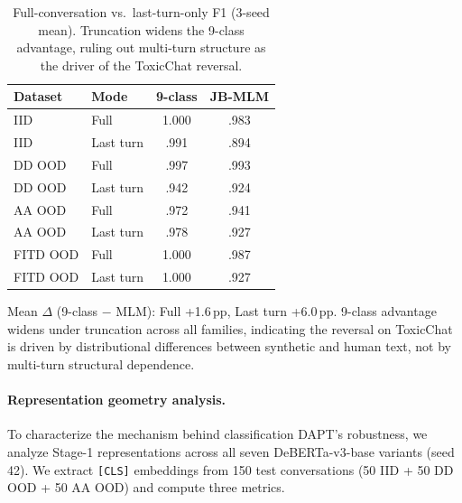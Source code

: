 \begin{table}[h]
\centering
\caption{Full-conversation vs.\ last-turn-only F1 (3-seed mean). Truncation widens the 9-class advantage, ruling out multi-turn structure as the driver of the ToxicChat reversal.}
\label{tab:truncated}
\begin{tabular}{@{}llcc@{}}
\toprule
\textbf{Dataset} & \textbf{Mode} & \textbf{9-class} & \textbf{JB-MLM} \\
\midrule
IID & Full & 1.000 & .983 \\
IID & Last turn & .991 & .894 \\
\midrule
DD OOD & Full & .997 & .993 \\
DD OOD & Last turn & .942 & .924 \\
\midrule
AA OOD & Full & .972 & .941 \\
AA OOD & Last turn & .978 & .927 \\
\midrule
FITD OOD & Full & 1.000 & .987 \\
FITD OOD & Last turn & 1.000 & .927 \\
\bottomrule
\end{tabular}
\vspace{-2pt}
{\footnotesize Mean $\Delta$ (9-class $-$ MLM): Full +1.6\,pp, Last turn +6.0\,pp. 9-class advantage widens under truncation across all families, indicating the reversal on ToxicChat is driven by distributional differences between synthetic and human text, not by multi-turn structural dependence.}
\end{table}

\paragraph{Representation geometry analysis.}
\label{app:representation}

To characterize the mechanism behind classification DAPT's robustness, we analyze Stage-1 representations across all seven DeBERTa-v3-base variants (seed 42). We extract \texttt{[CLS]} embeddings from 150 test conversations (50 IID + 50 DD OOD + 50 AA OOD) and compute three metrics.

